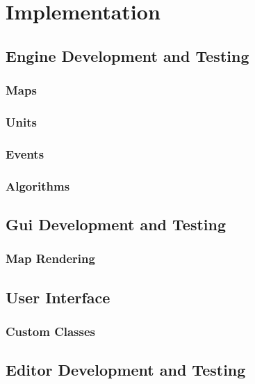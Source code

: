 \section{Implementation}

\subsection{Engine Development and Testing}
\label{sub:engine_development_and_testing}

\subsubsection{Maps}
\label{ssub:maps}

\subsubsection{Units}
\label{ssub:units}

\subsubsection{Events}
\label{ssub:events}

\subsubsection{Algorithms}
\label{ssub:Algorithms}


\subsection{Gui Development and Testing}

\subsubsection{Map Rendering}
\label{ssub:map_rendering}

\subsection{User Interface}


\subsubsection{Custom Classes} %
\label{ssub:custom_classes}


\subsection{Editor Development and Testing}

